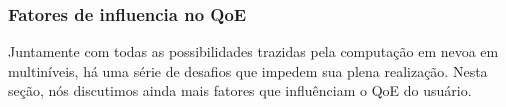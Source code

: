 %
%
%
%

\subsubsection{Fatores de influencia no QoE}

Juntamente com todas as possibilidades trazidas pela computação em nevoa em multiníveis, há uma série de desafios que impedem sua plena realização. 
Nesta seção, nós discutimos ainda mais fatores que influênciam o QoE do usuário.

